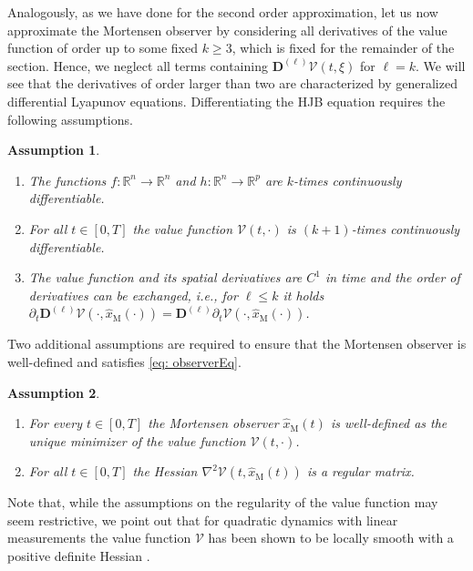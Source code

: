\documentclass[11pt,reqno]{amsart}
\numberwithin{equation}{section}
\theoremstyle{plain}
\newtheorem{assumption}{Assumption}
\newcommand{\TenDeriv}[1]{\mathbf{D}^{(#1)}}
\begin{document}
Analogously, as we have done for the second order approximation, let us now approximate the Mortensen observer by considering all derivatives of the value function of order up to some fixed $k\ge 3$, which is fixed for the remainder of the section. Hence, we neglect all terms containing $\TenDeriv{\ell} \mathcal{V}(t,\xi)$ for $\ell=k$. We will see that the derivatives of order larger than two are characterized by generalized differential Lyapunov equations. Differentiating the HJB equation requires the following assumptions.
%
\begin{assumption}~ \label{ass:smoothness}
    \begin{enumerate}
        \item The functions $f \colon \mathbb{R}^n \to \mathbb{R}^n$ and $h \colon \mathbb{R}^n \to \mathbb{R}^p$ are $k$-times continuously differentiable.
        \item For all $t \in [0,T]$ the value function $\mathcal{V}(t,\cdot)$ is $(k+1)$-times continuously differentiable.
        \item The value function and its spatial derivatives are $C^1$ in time and the order of derivatives can be exchanged, i.e., for $\ell \leq k $ it holds
        $ \partial_t \TenDeriv{\ell} \mathcal{V}(\cdot,\widehat{x}_\mathrm{M}(\cdot)) = \TenDeriv{\ell} \partial_t \mathcal{V}(\cdot,\widehat{x}_\mathrm{M}(\cdot)) $.
    \end{enumerate}
\end{assumption}
%
Two additional assumptions are required to ensure that the Mortensen observer is well-defined and satisfies \cref{eq: observerEq}.
%
\begin{assumption}~ \label{ass:mortensen}
    \begin{enumerate}
        \item For every $t \in [0,T]$ the Mortensen observer $\widehat{x}_\mathrm{M}(t)$ is well-defined as the unique minimizer of the value function $\mathcal{V}(t,\cdot)$.
        \item For all $t \in [0,T]$ the Hessian $\nabla^2 \mathcal{V}(t,\widehat{x}_\mathrm{M}(t))$ is a regular matrix.
    \end{enumerate}
\end{assumption}
%
Note that, while the assumptions on the regularity of the value function may seem restrictive, we point out that for quadratic dynamics with linear measurements the value function $\mathcal{V}$ has been shown to be locally smooth with a positive definite Hessian \cite{BreS24}.
\end{document}
